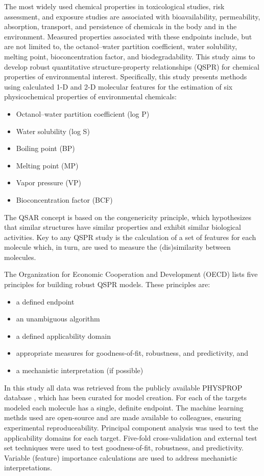 \documentclass[10pt, letter]{article}
\renewcommand{\=}{\, =\, }
\newcommand{\+}{\, +\, }
\renewcommand{\-}{\, -\, }
\begin{document}
The most widely used chemical properties in toxicological
studies, risk assessment, and exposure studies are
associated with bioavailability, permeability, absorption,
transport, and persistence of chemicals in the body and
in the environment. Measured properties associated with these endpoints include,
but are not limited to, the octanol–water partition
coefficient, water solubility, melting point, bioconcentration
factor, and biodegradability. This study aims to develop robust quantitative structure-property relationships (QSPR) for chemical properties of environmental interest. Specifically, this study presents methods using calculated 1-D and 2-D molecular features for
the estimation of six physicochemical properties of environmental chemicals:
\begin{itemize}
\item Octanol–water partition coefficient (log P)
\item Water solubility (log S)
\item Boiling point (BP)
\item Melting point (MP)
\item Vapor pressure (VP)
\item Bioconcentration factor (BCF)
\end{itemize}

The QSAR concept
is based on the congenericity principle, which hypothesizes
that similar structures have similar properties and
exhibit similar biological activities. Key to any QSPR study is the calculation of a set of features for each molecule which, in turn, are used
to measure the (dis)similarity between molecules.

The Organization for Economic Cooperation and Development (OECD) lists five principles for building robust QSPR models. These principles are:
\begin{itemize}
\item a defined endpoint
\item an unambiguous algorithm
\item a defined applicability domain
\item appropriate measures for goodness-of-fit, robustness, and predictivity, and
\item a mechanistic interpretation (if possible)
\end{itemize}

In this study all data was retrieved from the publicly available PHYSPROP database \cite{howard2000physprop}, which has been curated for model creation. For each of the targets modeled
each molecule has a single, definite endpoint. The machine learning methds used are open-source and
are made available to colleagues, ensuring experimental reproduceability. Principal component analysis was used to test the applicability domains for each target. Five-fold cross-validation and external test set techniques were used to test goodness-of-fit, robustness, and predictivity. Variable (feature) importance calculations are used to address mechanistic interpretations.
\end{document}
